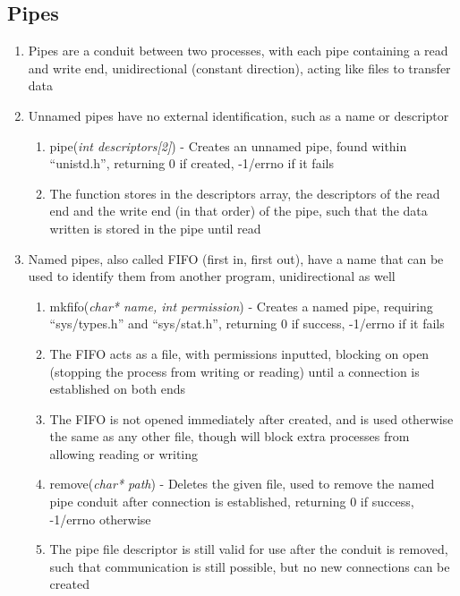 \documentclass[11 pt, twoside]{article}
\begin{document}
\subsection{Pipes}
\begin{enumerate}
\item Pipes are a conduit between two processes, with each pipe containing a read and write end, unidirectional (constant direction), acting like files to transfer data
\item Unnamed pipes have no external identification, such as a name or descriptor
\begin{enumerate}
\item pipe(\textit{int descriptors[2]}) - Creates an unnamed pipe, found within ``unistd.h'', returning 0 if created, -1/errno if it fails
\item The function stores in the descriptors array, the descriptors of the read end and the write end (in that order) of the pipe, such that the data written is stored in the pipe until read
\end{enumerate}
\item Named pipes, also called FIFO (first in, first out), have a name that can be used to identify them from another program, unidirectional as well
\begin{enumerate}
\item mkfifo(\textit{char* name, int permission}) - Creates a named pipe, requiring ``sys/types.h'' and ``sys/stat.h'', returning 0 if success, -1/errno if it fails
\item The FIFO acts as a file, with permissions inputted, blocking on open (stopping the process from writing or reading) until a connection is established on both ends
\item The FIFO is not opened immediately after created, and is used otherwise the same as any other file, though will block extra processes from allowing reading or writing
\item remove(\textit{char* path}) - Deletes the given file, used to remove the named pipe conduit after connection is established, returning 0 if success, -1/errno otherwise
\item The pipe file descriptor is still valid for use after the conduit is removed, such that communication is still possible, but no new connections can be created
\end{enumerate}
\end{enumerate}
\end{document}
